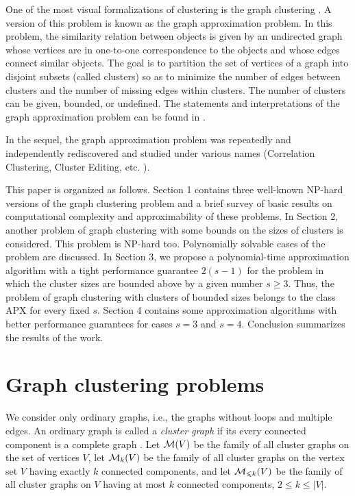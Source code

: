 \documentclass[runningheads]{llncs}
\begin{document}
One of the most visual formalizations of clustering 
is the graph clustering \cite{s05}. 
A version of this problem is known as the graph approximation problem.
In this problem, the similarity relation between objects is given by an
undirected graph whose vertices are in one-to-one correspondence
to the objects and whose edges connect similar objects. 
The goal is to partition the set of vertices 
of a graph into disjoint subsets (called clusters) so as to minimize 
the number of edges between clusters and the number of missing edges 
within clusters. 
The number of clusters can be given, bounded, or
undefined. The statements and interpretations of the graph
approximation problem can be found in 
\cite{aikt06,f71,f76,t74,z64}.

In the sequel, the graph approximation problem was repeatedly and
independently rediscovered and studied under various names 
(Correlation Clustering, Cluster Editing, etc. 
\cite{bbc04,bsy99,sst04}).

This paper is organized as follows.
Section 1 contains three well-known NP-hard versions of the graph
clustering problem and a brief survey of basic
results on computational complexity and approximability
of these problems. 
In Section 2, another problem of graph clustering 
with some bounds on the sizes of clusters is considered. 
This problem is NP-hard too. Polynomially solvable cases 
of the problem are discussed. 
In Section 3, we propose a polynomial-time approximation
algorithm with a tight performance guarantee $2(s-1)$
for the problem in which the cluster sizes are bounded
above by a given number $s \geqslant 3$. 
Thus, the problem of graph clustering with clusters of bounded sizes 
belongs to the class APX for every fixed $s$.
Section 4 contains some approximation algorithms with better performance 
guarantees for cases $s=3$ and $s=4$. 
Conclusion summarizes the results of the work.

\section{Graph clustering problems}

We consider only ordinary graphs, i.e., the graphs without loops
and multiple edges. An ordinary graph is called a {\it cluster graph} 
if its every connected component is a complete graph \cite{sst04}. 
Let ${\cal M}(V)$ be the family of all cluster graphs on the set of vertices
$V$, let ${\cal M}_k(V)$ be the family of all cluster graphs on the
vertex set $V$ having exactly $k$ connected components,
and let ${\cal M}_{\leqslant k}(V)$ be the family of all cluster graphs on
$V$ having at most $k$ connected components, ${2 \leqslant k
\leqslant |V|}$.
\end{document}
